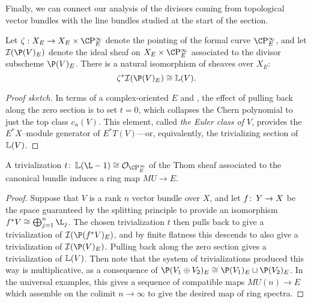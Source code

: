 Finally, we can connect our analysis of the divisors coming from topological vector bundles with the line bundles studied at the start of the section.
\begin{lemma}
Let $\zeta: X_E \to X_E \times \CP^\infty_E$ denote the pointing of the formal curve $\CP^\infty_E$, and let $\sheaf I(\P(V)_E)$ denote the ideal sheaf on $X_E \times \CP^\infty_E$ associated to the divisor subscheme $\P(V)_E$.  There is a natural isomorphism of sheaves over $X_E$: \[\zeta^* \sheaf I(\P(V)_E) \cong \ThomSheaf{V}.\]
\end{lemma}
\begin{proof}[Proof sketch]
In terms of a complex-oriented $E$ and , the effect of pulling back along the zero section is to set $t = 0$, which collapses the Chern polynomial to just the top class $c_n(V)$.  This element, called \textit{the Euler class of $V$}, provides the $E^* X$--module generator of $E^* T(V)$---or, equivalently, the trivializing section of $\mathbb{L}(V)$.
\end{proof}

\begin{theorem}\label{ComplexOrientationsInTermsOfTrivs}
A trivialization $t\co \ThomSheaf{\L - 1} \cong \sheaf O_{\CP^\infty_E}$ of the Thom sheaf associated to the canonical bundle induces a ring map $MU \to E$.
\end{theorem}
\begin{proof}
Suppose that $V$ is a rank $n$ vector bundle over $X$, and let $f\colon\thinspace Y \to X$ be the space guaranteed by the splitting principle to provide an isomorphism $f^* V \cong \bigoplus_{j=1}^n \L_j$.  The chosen trivialization $t$ then pulls back to give a trivialization of $\sheaf I(\P(f^* V)_E)$, and by finite flatness this descends to also give a trivialization of $\sheaf I(\P(V)_E)$.  Pulling back along the zero section gives a trivialization of $\mathbb{L}(V)$.  Then note that the system of trivializations produced this way is multiplicative, as a consequence of $\P(V_1 \oplus V_2)_E \cong \P(V_1)_E \sqcup \P(V_2)_E$.  In the universal examples, this gives a sequence of compatible maps $MU(n) \to E$ which assemble on the colimit $n \to \infty$ to give the desired map of ring spectra.
\end{proof}










